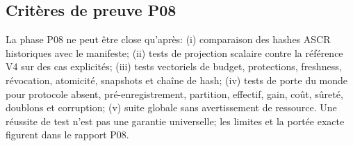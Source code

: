 \documentclass[10pt,a4paper]{article}
\begin{document}
\subsection{Critères de preuve P08}
La phase P08 ne peut être close qu'après: (i) comparaison des hashes ASCR historiques avec le manifeste; (ii) tests de projection scalaire contre la référence V4 sur des cas explicités; (iii) tests vectoriels de budget, protections, freshness, révocation, atomicité, snapshots et chaîne de hash; (iv) tests de porte du monde pour protocole absent, pré-enregistrement, partition, effectif, gain, coût, sûreté, doublons et corruption; (v) suite globale sans avertissement de ressource. Une réussite de test n'est pas une garantie universelle; les limites et la portée exacte figurent dans le rapport P08.
\end{document}
